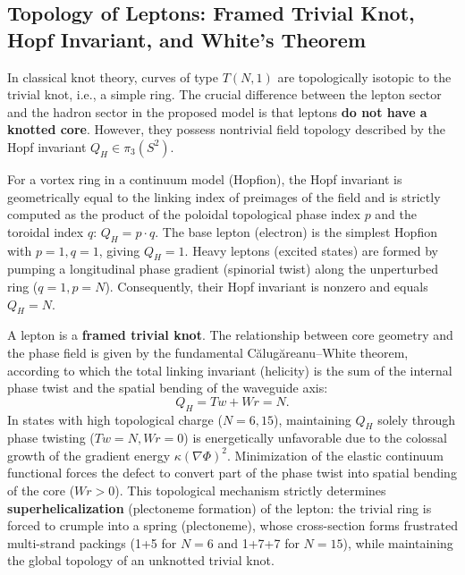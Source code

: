 \documentclass[11pt,a4paper]{article}
\begin{document}
\subsection{Topology of Leptons: Framed Trivial Knot, Hopf Invariant, and White's Theorem}
In classical knot theory, curves of type $T(N,1)$ are topologically isotopic to the trivial knot, i.e., a simple ring. The crucial difference between the lepton sector and the hadron sector in the proposed model is that leptons \textbf{do not have a knotted core}. However, they possess nontrivial field topology described by the Hopf invariant $Q_H \in \pi_3(S^2)$.

For a vortex ring in a continuum model (Hopfion), the Hopf invariant is geometrically equal to the linking index of preimages of the field and is strictly computed as the product of the poloidal topological phase index $p$ and the toroidal index $q$: $Q_H = p \cdot q$.
The base lepton (electron) is the simplest Hopfion with $p=1, q=1$, giving $Q_H = 1$. Heavy leptons (excited states) are formed by pumping a longitudinal phase gradient (spinorial twist) along the unperturbed ring ($q=1, p=N$). Consequently, their Hopf invariant is nonzero and equals $Q_H = N$.

A lepton is a \textbf{framed trivial knot}. The relationship between core geometry and the phase field is given by the fundamental Călugăreanu–White theorem, according to which the total linking invariant (helicity) is the sum of the internal phase twist and the spatial bending of the waveguide axis:
\begin{equation}
Q_H = Tw + Wr = N.
\end{equation}
In states with high topological charge ($N=6,15$), maintaining $Q_H$ solely through phase twisting ($Tw=N, Wr=0$) is energetically unfavorable due to the colossal growth of the gradient energy $\kappa (\nabla \Phi)^2$. Minimization of the elastic continuum functional forces the defect to convert part of the phase twist into spatial bending of the core ($Wr > 0$).
This topological mechanism strictly determines \textbf{superhelicalization} (plectoneme formation) of the lepton: the trivial ring is forced to crumple into a spring (plectoneme), whose cross-section forms frustrated multi-strand packings (1+5 for $N=6$ and 1+7+7 for $N=15$), while maintaining the global topology of an unknotted trivial knot.
\end{document}
